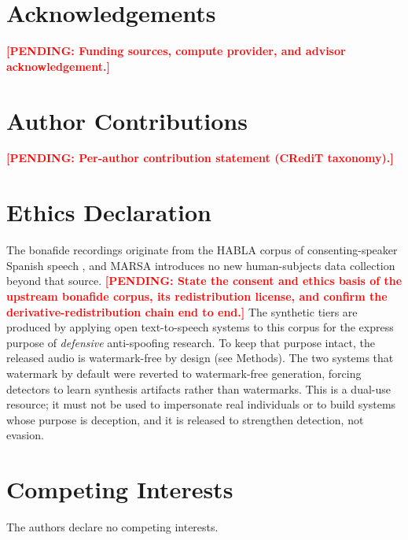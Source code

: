 \documentclass[11pt]{article}
\newcommand{\PENDING}[1]{\textcolor{red}{\textbf{[PENDING: #1]}}}
\begin{document}
\section*{Acknowledgements}
\PENDING{Funding sources, compute provider, and advisor acknowledgement.}

\section*{Author Contributions}
\PENDING{Per-author contribution statement (CRediT taxonomy).}

\section*{Ethics Declaration}
The bonafide recordings originate from the HABLA corpus of
consenting-speaker Spanish speech \citep{habla}, and MARSA introduces no
new human-subjects data collection beyond that source. \PENDING{State the
consent and ethics basis of the upstream bonafide corpus, its
redistribution license, and confirm the derivative-redistribution chain
end to end.} The synthetic tiers are produced by applying open
text-to-speech systems to this corpus for the express purpose of
\emph{defensive} anti-spoofing research. To keep that purpose intact,
the released audio is watermark-free by design (see Methods). The two
systems that watermark by default were reverted to watermark-free
generation, forcing detectors to learn synthesis artifacts rather than
watermarks. This is a dual-use resource; it must not be used to
impersonate real individuals or to build systems whose purpose is
deception, and it is released to strengthen detection, not evasion.

\section*{Competing Interests}
The authors declare no competing interests.
\end{document}
